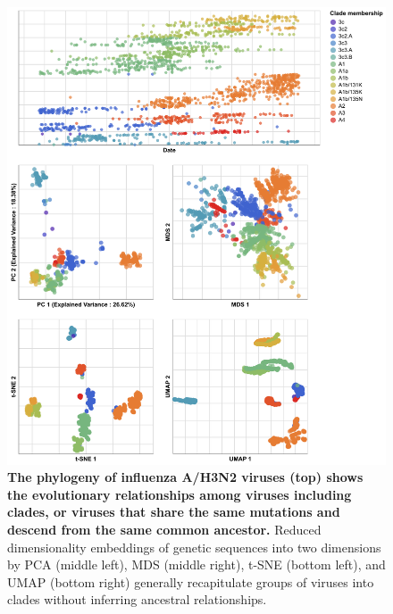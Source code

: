 \documentclass[10pt,letterpaper]{article}
\begin{document}
\begin{figure}[!h]
\includegraphics[width=\columnwidth]{figures/flu-2016-2018-ha-embeddings-by-clade.png}
\caption{{\bf The phylogeny of influenza A/H3N2 viruses (top) shows the evolutionary relationships among viruses including clades, or viruses that share the same mutations and descend from the same common ancestor.}
Reduced dimensionality embeddings of genetic sequences into two dimensions by PCA (middle left), MDS (middle right), t-SNE (bottom left), and UMAP (bottom right) generally recapitulate groups of viruses into clades without inferring ancestral relationships.}
\label{fig:seasonal-influenza-h3n2-ha-embeddings}
\end{figure}
\end{document}
